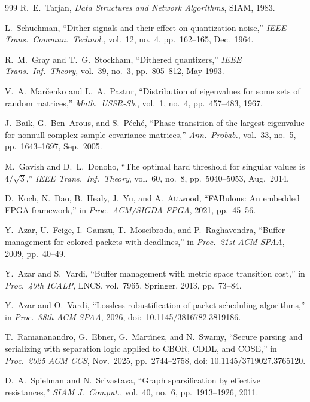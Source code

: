 \documentclass[11pt,letterpaper]{article}
\theoremstyle{spectralthm}
\begin{document}
\begin{thebibliography}{999}
R.~E.~Tarjan, \textit{Data Structures and Network Algorithms}, SIAM, 1983.

L.~Schuchman, ``Dither signals and their effect on quantization noise,'' \textit{IEEE Trans.\ Commun.\ Technol.}, vol.~12, no.~4, pp.~162--165, Dec.\ 1964.

R.~M.~Gray and T.~G.~Stockham, ``Dithered quantizers,'' \textit{IEEE Trans.\ Inf.\ Theory}, vol.~39, no.~3, pp.~805--812, May 1993.

V.~A.~Mar\v{c}enko and L.~A.~Pastur, ``Distribution of eigenvalues for some sets of random matrices,'' \textit{Math.\ USSR-Sb.}, vol.~1, no.~4, pp.~457--483, 1967.

J.~Baik, G.~Ben~Arous, and S.~P\'{e}ch\'{e}, ``Phase transition of the largest eigenvalue for nonnull complex sample covariance matrices,'' \textit{Ann.\ Probab.}, vol.~33, no.~5, pp.~1643--1697, Sep.\ 2005.

M.~Gavish and D.~L.~Donoho, ``The optimal hard threshold for singular values is $4/\sqrt{3}$,'' \textit{IEEE Trans.\ Inf.\ Theory}, vol.~60, no.~8, pp.~5040--5053, Aug.\ 2014.

D.~Koch, N.~Dao, B.~Healy, J.~Yu, and A.~Attwood, ``FABulous: An embedded FPGA framework,'' in \textit{Proc.\ ACM/SIGDA FPGA}, 2021, pp.~45--56.

Y.~Azar, U.~Feige, I.~Gamzu, T.~Moscibroda, and P.~Raghavendra, ``Buffer management for colored packets with deadlines,'' in \textit{Proc.\ 21st ACM SPAA}, 2009, pp.~40--49.

Y.~Azar and S.~Vardi, ``Buffer management with metric space transition cost,'' in \textit{Proc.\ 40th ICALP}, LNCS, vol.~7965, Springer, 2013, pp.~73--84.

Y.~Azar and O.~Vardi, ``Lossless robustification of packet scheduling algorithms,'' in \textit{Proc.\ 38th ACM SPAA}, 2026, doi:~10.1145/3816782.3819186.

T.~Ramananandro, G.~Ebner, G.~Mart{\'\i}nez, and N.~Swamy, ``Secure parsing and serializing with separation logic applied to CBOR, CDDL, and COSE,'' in \emph{Proc.\ 2025 ACM CCS}, Nov.\ 2025, pp.~2744--2758, doi: 10.1145/3719027.3765120.

D.~A.~Spielman and N.~Srivastava, ``Graph sparsification by effective resistances,'' \textit{SIAM J.\ Comput.}, vol.~40, no.~6, pp.~1913--1926, 2011.


\end{thebibliography}
\end{document}
